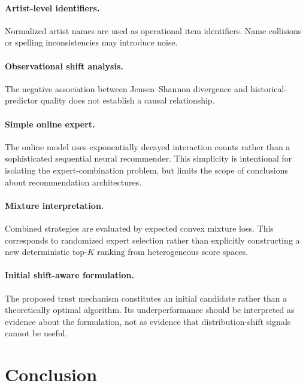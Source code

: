 \documentclass[11pt]{article}
\begin{document}
\paragraph{Artist-level identifiers.}
Normalized artist names are used as operational item identifiers.
Name collisions or spelling inconsistencies may introduce noise.

\paragraph{Observational shift analysis.}
The negative association between Jensen--Shannon divergence and
historical-predictor quality does not establish a causal relationship.

\paragraph{Simple online expert.}
The online model uses exponentially decayed interaction counts rather
than a sophisticated sequential neural recommender. This simplicity is
intentional for isolating the expert-combination problem, but limits
the scope of conclusions about recommendation architectures.

\paragraph{Mixture interpretation.}
Combined strategies are evaluated by expected convex mixture loss.
This corresponds to randomized expert selection rather than explicitly
constructing a new deterministic top-$K$ ranking from heterogeneous
score spaces.

\paragraph{Initial shift-aware formulation.}
The proposed trust mechanism constitutes an initial candidate rather
than a theoretically optimal algorithm. Its underperformance should be
interpreted as evidence about the formulation, not as evidence that
distribution-shift signals cannot be useful.


\section{Conclusion}
\end{document}
